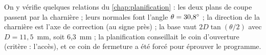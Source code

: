 \enlargethispage{3\baselineskip}%
On y vérifie quelques relations du \cref{chap:planification} : les deux plans de coupe passent par la charnière ;
leurs normales font l'angle $\theta = 30{,}8^\circ$ ; la direction de la charnière est l'axe de correction (au signe
près) ; la base vaut $2 D \tan(\theta/2)$ avec $D = 11{,}5$~mm, soit 6,3~mm ; la planification conseillait le coin
d'ouverture (critère : l'accès), et ce coin de fermeture a été forcé pour éprouver le programme.
